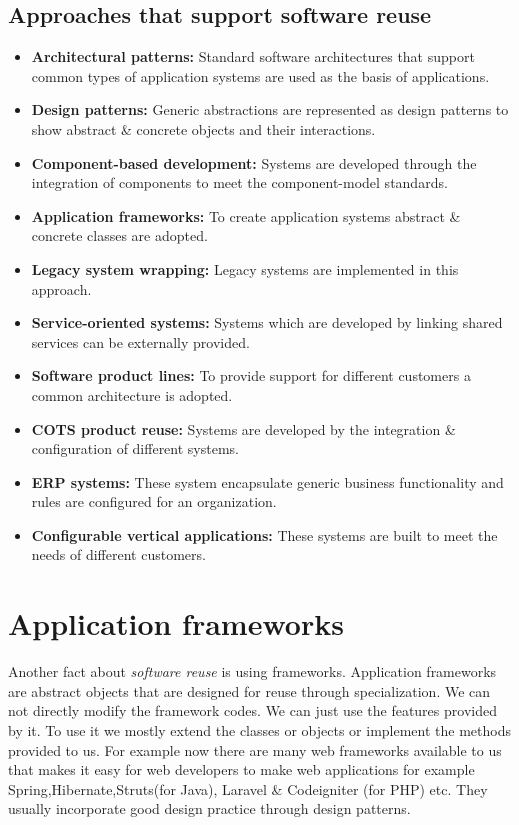 \documentclass[dvips,12pt]{article}
\begin{document}
\subsection{Approaches that support software reuse}
\begin{itemize}
\item \textbf{Architectural patterns:} Standard software architectures that support common types of application systems are used as the basis of applications.
\item \textbf{Design patterns:} Generic abstractions are represented as design patterns to show abstract \& concrete objects and their interactions.
\item \textbf{Component-based development:} Systems are developed through the integration of components to meet the component-model standards. 
\item \textbf{Application frameworks:} To create application systems abstract \& concrete classes are adopted.
\item \textbf{Legacy system wrapping:} Legacy systems are implemented in this approach.
\item \textbf{Service-oriented systems:} Systems which are developed by linking shared services can be externally provided.
\item \textbf{Software product lines:} To provide support for different customers a common architecture is adopted.
\item \textbf{COTS product reuse:} Systems are developed by the integration \& configuration of different systems.
\item \textbf{ERP systems:} These system encapsulate generic business functionality and rules are configured for an organization.
\item \textbf{Configurable vertical applications:} These systems are built to meet the needs of different customers. 
\end{itemize}

\section{Application frameworks}
Another fact about \emph{software reuse} is using frameworks. Application
frameworks are abstract objects that are designed for reuse through specialization. We can not directly modify the framework codes. We can just use the features provided by it. To use it we mostly extend the classes or objects or implement the methods provided to us. For example now there are many web frameworks available to us that makes it easy for web developers to make web applications for example Spring,Hibernate,Struts(for Java), Laravel \& Codeigniter (for PHP) etc. They usually incorporate good design practice through design patterns.
\end{document}
